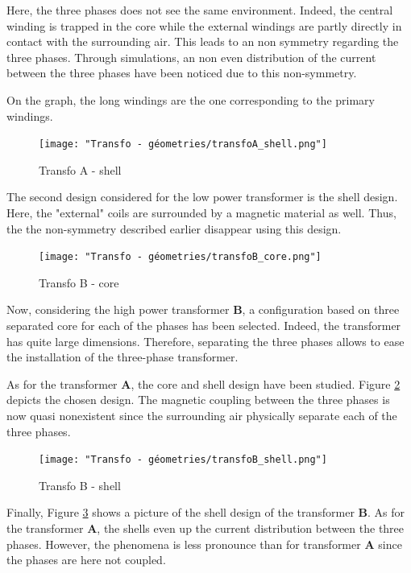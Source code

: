 \documentclass[12pt,a4paper]{report}
\begin{document}
Here, the three phases does not see the same environment. Indeed, the central winding is trapped in the core while the external windings are partly directly in contact with the surrounding air. This leads to an non symmetry regarding the three phases. Through simulations, an non even distribution of the current between the three phases have been noticed due to this non-symmetry.

On the graph, the long windings are the one corresponding to the primary windings.
\newpage
\begin{figure}[h]
    \centering
    \texttt{[image: "Transfo - géometries/transfoA\_shell.png"]}
    \caption{Transfo A - shell}
    \label{fig:Ashell}
\end{figure}

The second design considered for the low power transformer is the shell design. Here, the "external" coils are surrounded by a magnetic material as well. Thus, the the non-symmetry described earlier disappear using this design.

\begin{figure}[h]
    \centering
    \texttt{[image: "Transfo - géometries/transfoB\_core.png"]}
    \caption{Transfo B - core}
    \label{fig:Bcore}
\end{figure}

Now, considering the high power transformer \textbf{B}, a configuration based on three separated core for each of the phases has been selected. Indeed, the transformer has quite large dimensions. Therefore, separating the three phases allows to ease the installation of the three-phase transformer.

As for the transformer \textbf{A}, the core and shell design have been studied. Figure \ref{fig:Bcore} depicts the chosen design. The magnetic coupling between the three phases is now quasi nonexistent since the surrounding air physically separate each of the three phases.

\begin{figure}[h]
    \centering
    \texttt{[image: "Transfo - géometries/transfoB\_shell.png"]}
    \caption{Transfo B - shell}
    \label{fig:Bshell}
\end{figure}

Finally, Figure \ref{fig:Bshell} shows a picture of the shell design of the transformer \textbf{B}. As for the transformer \textbf{A}, the shells even up the current distribution between the three phases. However, the phenomena is less pronounce than for transformer \textbf{A} since the phases are here not coupled.
\end{document}
